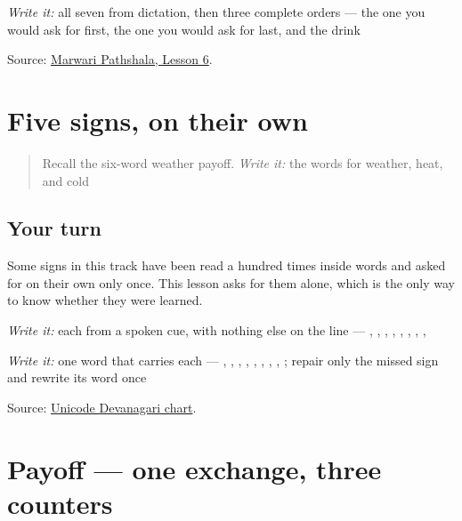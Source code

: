 \emph{Write it:} all seven from dictation, then three complete orders — the one you would ask for first, the one you would ask for last, and the drink

\begin{tcolorbox}[breakable,colback=teal!4,colframe=teal!35!black,title={Before you move on}]
Source: \href{https://www.marwaripathshala.com/marwari-lesson-6-english}{Marwari Pathshala, Lesson 6}.
\end{tcolorbox}
\section[Practice]{Five signs, on their own}

\label{lesson:MW-R26-letters-close}



\begin{quote}
Recall the six-word weather payoff. \emph{Write it:} the words for weather, heat, and cold
\end{quote}

\subsection*{Your turn}
Some signs in this track have been read a hundred times inside words and asked for on their own only once. This lesson asks for them alone, which is the only way to know whether they were learned.

\emph{Write it:} each from a spoken cue, with nothing else on the line — \textbf{}, \textbf{}, \textbf{}, \textbf{}, \textbf{}, \textbf{}, \textbf{}, \textbf{}, \textbf{}

\emph{Write it:} one word that carries each — \textbf{}, \textbf{}, \textbf{}, \textbf{}, \textbf{}, \textbf{}, \textbf{}, \textbf{}, \textbf{}; repair only the missed sign and rewrite its word once

\begin{tcolorbox}[breakable,colback=teal!4,colframe=teal!35!black,title={Before you move on}]
Source: \href{https://www.unicode.org/charts/PDF/U0900.pdf}{Unicode Devanagari chart}.
\end{tcolorbox}
\section[Practice]{Payoff — one exchange, three counters}

